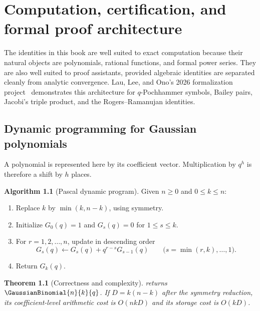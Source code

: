 \documentclass[11pt,a4paper,oneside,openany]{book}
\newtheorem{theorem}{Theorem}[chapter]
\theoremstyle{definition}
\newtheorem{algorithm}[algorithm]{Algorithm}
\theoremstyle{remark}
\begin{document}


\chapter{Computation, certification, and formal proof architecture}\label{chap:formalization}

The identities in this book are well suited to exact computation because their natural objects are polynomials, rational functions, and formal power series.  They are also well suited to proof assistants, provided algebraic identities are separated cleanly from analytic convergence.  Lau, Lee, and Ono's 2026 formalization project~\cite{LauLeeOno2026} demonstrates this architecture for $q$-Pochhammer symbols, Bailey pairs, Jacobi's triple product, and the Rogers--Ramanujan identities.

\section{Dynamic programming for Gaussian polynomials}

A polynomial is represented here by its coefficient vector.  Multiplication by $q^h$ is therefore a shift by $h$ places.

\begin{algorithm}[Pascal dynamic program]\label{alg:gaussian-dp}
Given $n\ge0$ and $0\le k\le n$:
\begin{enumerate}
\item Replace $k$ by $\min(k,n-k)$, using symmetry.
\item Initialize $G_0(q)=1$ and $G_s(q)=0$ for $1\le s\le k$.
\item For $r=1,2,\ldots,n$, update in descending order
\[
 G_s(q)\leftarrow G_s(q)+q^{r-s}G_{s-1}(q)
 \qquad
 \bigl(s=\min(r,k),\ldots,1\bigr).
\]
\item Return $G_k(q)$.
\end{enumerate}
\end{algorithm}

\begin{theorem}[Correctness and complexity]\label{thm:gaussian-dp-correct}
 returns $\GaussianBinomial{n}{k}{q}$.  If $D=k(n-k)$ after the symmetry reduction, its coefficient-level arithmetic cost is $O(nkD)$ and its storage cost is $O(kD)$.
\end{theorem}
\end{document}
